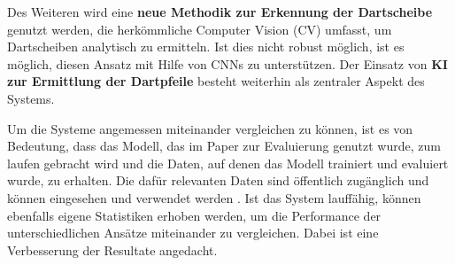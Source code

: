 Des Weiteren wird eine \textbf{neue Methodik zur Erkennung der Dartscheibe} genutzt werden, die herkömmliche Computer Vision (CV) umfasst, um Dartscheiben analytisch zu ermitteln. Ist dies nicht robust möglich, ist es möglich, diesen Ansatz mit Hilfe von CNNs zu unterstützen. Der Einsatz von \textbf{KI zur Ermittlung der Dartpfeile} besteht weiterhin als zentraler Aspekt des Systems.

Um die Systeme angemessen miteinander vergleichen zu können, ist es von Bedeutung, dass das Modell, das im Paper zur Evaluierung genutzt wurde, zum laufen gebracht wird und die Daten, auf denen das Modell trainiert und evaluiert wurde, zu erhalten. Die dafür relevanten Daten sind öffentlich zugänglich und können eingesehen und verwendet werden \cite{deepdarts-data}. Ist das System lauffähig, können ebenfalls eigene Statistiken erhoben werden, um die Performance der unterschiedlichen Ansätze miteinander zu vergleichen. Dabei ist eine Verbesserung der Resultate angedacht.

\iffalse

